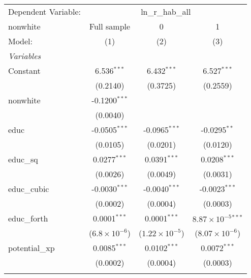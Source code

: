 
\begingroup
\centering
\begin{tabular}{lccc}
   \tabularnewline \midrule \midrule
   Dependent Variable: & \multicolumn{3}{c}{ln\_r\_hab\_all}\\
   nonwhite                        & Full sample            & 0                       & 1 \\   
   Model:                          & (1)                    & (2)                     & (3)\\  
   \midrule
   \emph{Variables}\\
   Constant                        & 6.536$^{***}$          & 6.432$^{***}$           & 6.527$^{***}$\\   
                                   & (0.2140)               & (0.3725)                & (0.2559)\\   
   nonwhite                        & -0.1200$^{***}$        &                         &   \\   
                                   & (0.0040)               &                         &   \\   
   educ                            & -0.0505$^{***}$        & -0.0965$^{***}$         & -0.0295$^{**}$\\   
                                   & (0.0105)               & (0.0201)                & (0.0120)\\   
   educ\_sq                        & 0.0277$^{***}$         & 0.0391$^{***}$          & 0.0208$^{***}$\\   
                                   & (0.0026)               & (0.0049)                & (0.0031)\\   
   educ\_cubic                     & -0.0030$^{***}$        & -0.0040$^{***}$         & -0.0023$^{***}$\\   
                                   & (0.0002)               & (0.0004)                & (0.0003)\\   
   educ\_forth                     & 0.0001$^{***}$         & 0.0001$^{***}$          & $8.87\times 10^{-5}$$^{***}$\\    
                                   & ($6.8\times 10^{-6}$)  & ($1.22\times 10^{-5}$)  & ($8.07\times 10^{-6}$)\\    
   potential\_xp                   & 0.0085$^{***}$         & 0.0102$^{***}$          & 0.0072$^{***}$\\   
                                   & (0.0002)               & (0.0004)                & (0.0003)\\   
$$
\end{tabular}
